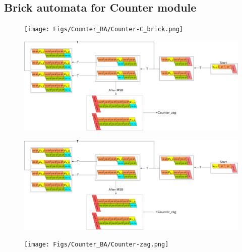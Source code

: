 \documentclass[runningheads]{llncs}
\begin{document}
\clearpage

	\subsection{Brick automata for Counter module}
	\label{ap_subsect:Counter_module_BA}

\begin{figure}[ht]
\centering
\texttt{[image: Figs/Counter\_BA/Counter-C\_brick.png]}
\caption{}
\label{fig:BA_counter_c}
\end{figure}

\begin{figure}[ht]
\centering
\includegraphics[width=\linewidth]{Figs/Counter_BA/Counter-NC_brick.png}
\caption{}
\label{fig:BA_counter_nc}
\end{figure}

\begin{figure}[ht]
\centering
\includegraphics[width=\linewidth]{Figs/Counter_BA/Counter-NC_seed_brick.png}
\caption{}
\label{fig:BA_counter_nc_seed}
\end{figure}

\begin{figure}[ht]
\centering
\texttt{[image: Figs/Counter\_BA/Counter-zag.png]}
\caption{}
\label{fig:BA_counter_zag}
\end{figure}
\end{document}

